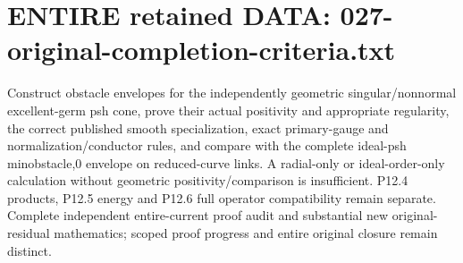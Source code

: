 \documentclass[11pt]{article}
\begin{document}
\begin{Full422Data}
\end{Full422Data}
\section{ENTIRE retained DATA: 027-original-completion-criteria.txt}
\begin{Full422Data}
Construct obstacle envelopes for the independently geometric singular/nonnormal excellent-germ psh cone, prove their actual positivity and appropriate regularity, the correct published smooth specialization, exact primary-gauge and normalization/conductor rules, and compare with the complete ideal-psh min{obstacle,0} envelope on reduced-curve links. A radial-only or ideal-order-only calculation without geometric positivity/comparison is insufficient. P12.4 products, P12.5 energy and P12.6 full operator compatibility remain separate.
Complete independent entire-current proof audit and substantial new original-residual mathematics; scoped proof progress and entire original closure remain distinct.
\end{Full422Data}
\end{document}
